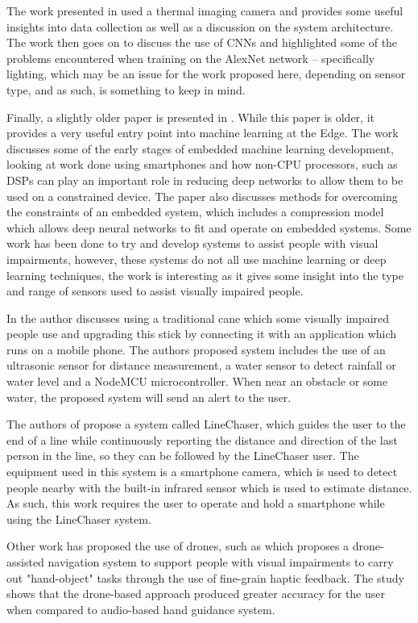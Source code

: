 \documentclass{svproc}
\begin{document}
The work presented in \cite{b19} used a thermal imaging camera and provides some useful insights into data collection as well as a 
discussion on the system architecture. The work then goes on to discuss the use of CNNs and highlighted some of the problems encountered 
when training on the AlexNet network – specifically lighting, which may be an issue for the work proposed here, depending on sensor type, 
and as such, is something to keep in mind.

Finally, a slightly older paper is presented in \cite{b20}. While this paper is older, it provides a very useful entry point into machine 
learning at the Edge. The work discusses some of the early stages of embedded machine learning development, looking at work done using 
smartphones and how non-CPU processors, such as DSPs can play an important role in reducing deep networks to allow them to be used on a 
constrained device. The paper also discusses methods for overcoming the constraints of an embedded system, which includes a compression model 
which allows deep neural networks to fit and operate on embedded systems. 
Some work has been done to try and develop systems to assist people with visual impairments, however, these systems do not all 
use machine learning or deep learning techniques, the work is interesting as it gives some insight into the type and range of sensors 
used to assist visually impaired people. 

In \cite{b21} the author discusses using a traditional cane which some visually impaired people use and upgrading this 
stick by connecting it with an application which runs on a mobile phone. The authors proposed system includes the use of 
an ultrasonic sensor for distance measurement, a water sensor to detect rainfall or water level and a NodeMCU microcontroller. 
When near an obstacle or some water, the proposed system will send an alert to the user.

The authors of \cite{b22} propose a system called LineChaser, which guides the user to the end of a line while continuously reporting 
the distance and direction of the last person in the line, so they can be followed by the LineChaser user. The equipment used in this 
system is a smartphone camera, which is used to detect people nearby with the built-in infrared sensor which is used to estimate distance. 
As such, this work requires the user to operate and hold a smartphone while using the LineChaser system.

Other work has proposed the use of drones, such as \cite{b23} which proposes a drone-assisted navigation system to support people with 
visual impairments to carry out "hand-object" tasks through the use of fine-grain haptic feedback. The study shows that the drone-based 
approach produced greater accuracy for the user when compared to audio-based hand guidance system. 
\end{document}
